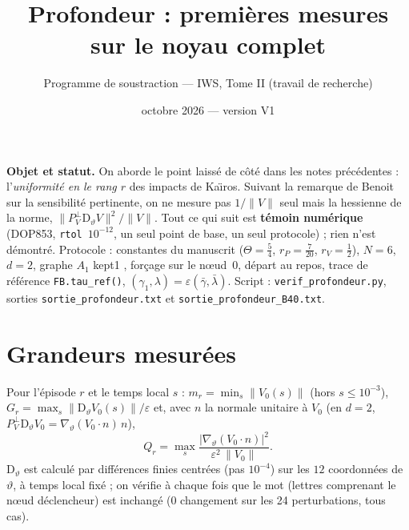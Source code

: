 \documentclass[11pt,a4paper]{article}
\title{Profondeur : premi\`eres mesures sur le noyau complet}
\author{Programme de soustraction --- IWS, Tome II (travail de recherche)}
\date{octobre 2026 --- version V1}
\theoremstyle{remark}
\newcommand{\norm}[1]{\lVert #1\rVert}
\newcommand{\vth}{\vartheta}
\newcommand{\D}{\mathrm D}
\begin{document}
\maketitle

\noindent\textbf{Objet et statut.} On aborde le point laiss\'e de c\^ot\'e dans les notes pr\'ec\'edentes : l'\emph{uniformit\'e en le rang $r$} des impacts de Ka\"{\i}ros. Suivant la remarque de Benoit sur la sensibilit\'e pertinente, on ne mesure pas $1/\norm{V}$ seul mais la hessienne de la norme, $\norm{P^\perp_V\D_\vth V}^2/\norm{V}$. Tout ce qui suit est \textbf{t\'emoin num\'erique} (DOP853, \texttt{rtol}~$10^{-12}$, un seul point de base, un seul protocole) ; rien n'est d\'emontr\'e. Protocole : constantes du manuscrit ($\Theta=\frac54$, $r_P=\frac7{20}$, $r_V=\frac12$), $N=6$, $d=2$, graphe $A_1$ \og kept1 \fg, for\c{c}age sur le n\oe ud~0, d\'epart au repos, trace de r\'ef\'erence \texttt{FB.tau\_ref()}, $(\gamma_1,\lambda)=\varepsilon(\bar\gamma,\bar\lambda)$. Script : \texttt{verif\_profondeur.py}, sorties \texttt{sortie\_profondeur.txt} et \texttt{sortie\_profondeur\_B40.txt}.

\section{Grandeurs mesur\'ees}
Pour l'\'episode $r$ et le temps local $s$ : $m_r=\min_{s}\norm{V_0(s)}$ (hors $s\le10^{-3}$), $G_r=\max_s\norm{\D_\vth V_0(s)}/\varepsilon$ et, avec $n$ la normale unitaire \`a $V_0$ (en $d=2$, $P^\perp_V\D_\vth V_0=\nabla_\vth(V_0\!\cdot n)\,n$),
\[
Q_r=\max_s\frac{\lvert\nabla_\vth (V_0\!\cdot n)\rvert^2}{\varepsilon^2\,\norm{V_0}}.
\]
$\D_\vth$ est calcul\'e par diff\'erences finies centr\'ees (pas $10^{-4}$) sur les $12$ coordonn\'ees de $\vth$, \`a temps local fix\'e ; on v\'erifie \`a chaque fois que le mot (lettres comprenant le n\oe ud d\'eclencheur) est inchang\'e (0 changement sur les 24 perturbations, tous cas).
\end{document}
